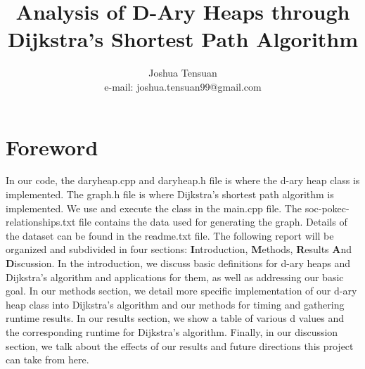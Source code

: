\documentclass[a4paper,10pt]{article}
\begin{document}
   \title{Analysis of D-Ary Heaps through Dijkstra's Shortest Path Algorithm}

   \author{Joshua Tensuan \\ e-mail: joshua.tensuan99@gmail.com}
          
   \date{}

   \maketitle
   
   \tableofcontents
 
  \newpage

\section*{Foreword}
In our code, the daryheap.cpp and daryheap.h file is where the d-ary heap class is implemented. The graph.h file is where Dijkstra's shortest path algorithm is implemented. We use and execute the class in the main.cpp file. The soc-pokec-relationships.txt file contains the data used for generating the graph. Details of the dataset can be found in the readme.txt file. \smallbreak
The following report will be organized and subdivided in four sections: \textbf{I}ntroduction, 
\textbf{M}ethods, \textbf{R}esults \textbf{A}nd \textbf{D}iscussion. In the introduction, we discuss basic definitions for d-ary heaps and Dijkstra's algorithm and applications for them, as well as addressing our basic goal. In our methods section, we detail more specific implementation of our d-ary heap class into Dijkstra's algorithm and our methods for timing and gathering runtime results. In our results section, we show a table of various d values and the corresponding runtime for Dijkstra's algorithm. Finally, in our discussion section, we talk about the effects of our results and future directions this project can take from here.
\end{document}
